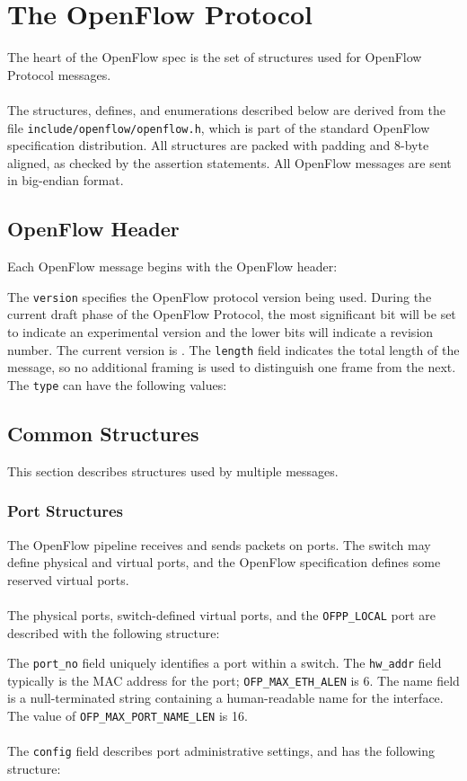 
\section{The OpenFlow Protocol}
The heart of the OpenFlow spec is the set of structures used for OpenFlow Protocol messages.  
\\\\
The structures, defines, and enumerations described below are derived from the file \verb|include/openflow/openflow.h|, which is part of the standard OpenFlow specification distribution.  All structures are packed with padding and 8-byte aligned, as checked by the assertion statements.  All OpenFlow messages are sent in big-endian format.  

\subsection{OpenFlow Header}
Each OpenFlow message begins with the OpenFlow header:


The \verb|version| specifies the OpenFlow protocol version being used.  During the current draft phase of the OpenFlow Protocol, the most significant bit will be set to indicate an experimental version and the lower bits will indicate a revision number.  The current version is .  The \verb|length| field indicates the total length of the message, so no additional framing is used to distinguish one frame from the next.  The \verb|type| can have the following values:



\subsection{Common Structures}
This section describes structures used by multiple messages.

\subsubsection{Port Structures}
The OpenFlow pipeline receives and sends packets on ports. The switch may define physical and virtual ports, and the OpenFlow specification defines some reserved virtual ports.
\\\\
The physical ports, switch-defined virtual ports, and the \verb|OFPP_LOCAL| port are described with the following structure:


The \verb|port_no| field uniquely identifies a port within a switch. The \verb|hw_addr| field typically is the MAC address for the port; \verb|OFP_MAX_ETH_ALEN| is 6.  The name field is a null-terminated string containing a human-readable name for the interface.  The value of \verb|OFP_MAX_PORT_NAME_LEN| is 16.
\\\\
The \verb|config| field describes port administrative settings, and has the following structure:

